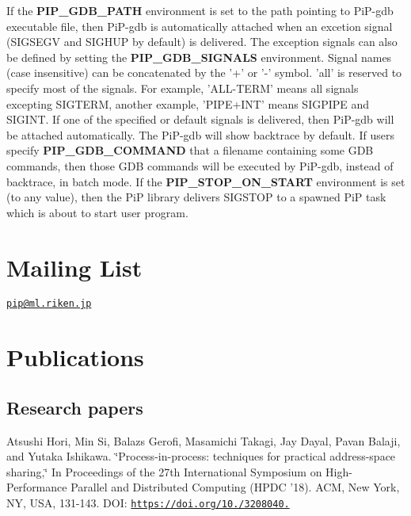 If the {\bfseries P\-I\-P\-\_\-\-G\-D\-B\-\_\-\-P\-A\-T\-H} environment is set to the path pointing to Pi\-P-\/gdb executable file, then Pi\-P-\/gdb is automatically attached when an excetion signal (S\-I\-G\-S\-E\-G\-V and S\-I\-G\-H\-U\-P by default) is delivered. The exception signals can also be defined by setting the {\bfseries P\-I\-P\-\_\-\-G\-D\-B\-\_\-\-S\-I\-G\-N\-A\-L\-S} environment. Signal names (case insensitive) can be concatenated by the '+' or '-\/' symbol. 'all' is reserved to specify most of the signals. For example, 'A\-L\-L-\/\-T\-E\-R\-M' means all signals excepting S\-I\-G\-T\-E\-R\-M, another example, 'P\-I\-P\-E+\-I\-N\-T' means S\-I\-G\-P\-I\-P\-E and S\-I\-G\-I\-N\-T. If one of the specified or default signals is delivered, then Pi\-P-\/gdb will be attached automatically. The Pi\-P-\/gdb will show backtrace by default. If users specify {\bfseries P\-I\-P\-\_\-\-G\-D\-B\-\_\-\-C\-O\-M\-M\-A\-N\-D} that a filename containing some G\-D\-B commands, then those G\-D\-B commands will be executed by Pi\-P-\/gdb, instead of backtrace, in batch mode. If the {\bfseries P\-I\-P\-\_\-\-S\-T\-O\-P\-\_\-\-O\-N\-\_\-\-S\-T\-A\-R\-T} environment is set (to any value), then the Pi\-P library delivers S\-I\-G\-S\-T\-O\-P to a spawned Pi\-P task which is about to start user program.

\section*{Mailing List}

\href{mailto:pip@ml.riken.jp}{\tt pip@ml.\-riken.\-jp}

\section*{Publications}

\subsection*{Research papers}

Atsushi Hori, Min Si, Balazs Gerofi, Masamichi Takagi, Jay Dayal, Pavan Balaji, and Yutaka Ishikawa. \char`\"{}\-Process-\/in-\/process\-: techniques for
practical address-\/space sharing,\char`\"{} In Proceedings of the 27th International Symposium on High-\/\-Performance Parallel and Distributed Computing (H\-P\-D\-C '18). A\-C\-M, New York, N\-Y, U\-S\-A, 131-\/143. D\-O\-I\-: \href{https://doi.org/10.1145/3208040.3208045}{\tt https\-://doi.\-org/10./3208040.}

